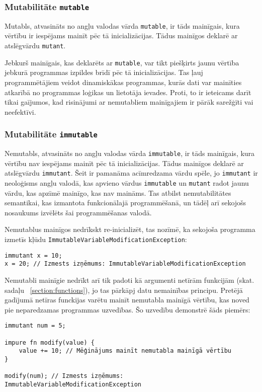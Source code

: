 \documentclass[12pt,a4paper]{report}
\begin{document}
\subsubsection{Mutabilitāte \texttt{mutable}}

Mutabls, atvasināts no angļu valodas vārda \texttt{mutable}, ir tāds mainīgais, kura vērtību ir iespējams mainīt pēc tā inicializācijas. Tādus mainīgos deklarē ar atslēgvārdu \texttt{mutant}.

Jebkurš mainīgais, kas deklarēts ar \texttt{mutable}, var tikt piešķirts jaunu vērtība jebkurā programmas izpildes brīdī pēc tā inicializācijas. Tas ļauj programmētājiem veidot dinamiskākas programmas, kurās dati var mainīties atkarībā no programmas loģikas un lietotāja ievades. Proti, to ir ieteicams darīt tikai gaījumos, kad risinājumi ar nemutabliem mainīgajiem ir pārāk sarežģīti vai neefektīvi.

\subsubsection{Mutabilitāte \texttt{immutable}}

Nemutabls, atvasināts no angļu valodas vārda \texttt{immutable}, ir tāds mainīgais, kura vērtību nav iespējams mainīt pēc tā inicializācijas. Tādus mainīgos deklarē ar atslēgvārdu \texttt{immutant}. Šeit ir pamanāma acīmredzama vārdu spēle, jo \texttt{immutant} ir neoloģisms angļu valodā, kas apvieno vārdus \texttt{immutable} un \texttt{mutant} radot jaunu vārdu, kas apzīmē mainīgo, kas nav maināms. Tas atbilst nemutabilitātes semantikai, kas izmantota funkcionālajā programmēšanā, un tādēļ arī sekojošs nosaukums izvēlēts šai programmēšanas valodā.

Nemutablus mainīgos nedrīkskt re-inicializēt, tas nozīmē, ka sekojoša programma izmetīs kļūdu \texttt{ImmutableVariableModificationException}:
\begin{verbatim}
immutant x = 10;
x = 20; // Izmests izņēmums: ImmutableVariableModificationException
\end{verbatim}

Nemutabli mainīgie nedrīkt arī tik padoti kā argumenti netīrām funkcijām (skat. sadaļu ~\ref{section:functions}), jo tas pārkāpj datu nemainības principu. Pretējā gadījumā netīras funckijas varētu mainīt nemutabla mainīgā vērtību, kas noved pie neparedzamas programmas uzvedības. Šo uzvedību demonstrē šāds piemērs:

\begin{verbatim}
immutant num = 5;

impure fn modify(value) {
    value += 10; // Mēģinājums mainīt nemutabla mainīgā vērtību
}

modify(num); // Izmests izņēmums: ImmutableVariableModificationException
\end{verbatim}
\end{document}
